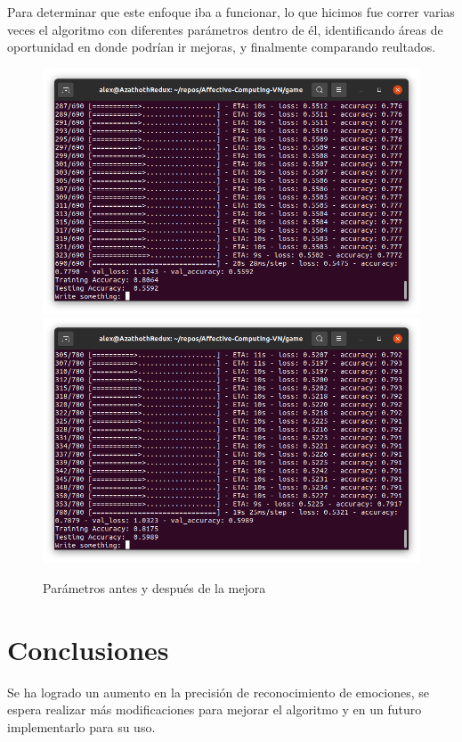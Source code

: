 \documentclass[a4]{sciposter}
\begin{document}
\begin{multicols}{2}
Para determinar que este enfoque iba a funcionar, lo que hicimos fue correr varias veces el algoritmo con diferentes parámetros dentro de él, identificando áreas de oportunidad en donde podrían ir mejoras, y finalmente comparando reultados.

\begin{figure}
	\captionsetup{type=figure}
	\setcounter{figure}{2}
	\includegraphics[scale=0.6]{img/Test 2021-05.png}
	\includegraphics[scale=0.6]{img/Test 2021-07.png}
	\caption{Parámetros antes y después de la mejora}
\end{figure}

\section{Conclusiones}

Se ha logrado un aumento en la precisión de reconocimiento de emociones, se espera realizar más modificaciones para mejorar el algoritmo y en un futuro implementarlo para su uso.


\end{multicols}
\end{document}
